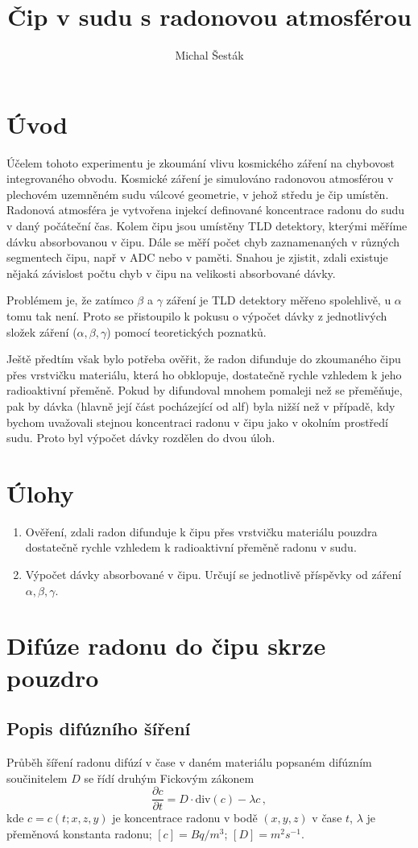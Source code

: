 \documentclass[11pt,a4paper]{article}
\author{Michal Šesták}
\title{Čip v sudu s radonovou atmosférou}
\begin{document}
\maketitle	
\tableofcontents
\section{Úvod}
Účelem tohoto experimentu je zkoumání vlivu kosmického záření na chybovost integrovaného obvodu. Kosmické záření je simulováno radonovou atmosférou v plechovém uzemněném sudu válcové geometrie, v jehož středu je čip umístěn. Radonová atmosféra je vytvořena injekcí definované koncentrace radonu do sudu v daný počáteční čas. Kolem čipu jsou umístěny TLD detektory, kterými měříme dávku absorbovanou v čipu. Dále se měří počet chyb zaznamenaných v různých segmentech čipu, např v ADC nebo v paměti. Snahou je zjistit, zdali existuje nějaká závislost počtu chyb v čipu na velikosti absorbované dávky.

Problémem je, že zatímco $\beta$ a $\gamma$ záření je TLD detektory měřeno spolehlivě, u $\alpha$ tomu tak není. Proto se přistoupilo k pokusu o výpočet dávky z jednotlivých složek záření ($\alpha, \beta, \gamma$) pomocí teoretických poznatků. 

Ještě předtím však bylo potřeba ověřit, že radon difunduje do zkoumaného čipu přes vrstvičku materiálu, která ho obklopuje, dostatečně rychle vzhledem k jeho radioaktivní přeměně. Pokud by difundoval mnohem pomaleji než se přeměňuje, pak by dávka (hlavně její část pocházející od alf) byla nižší než v případě, kdy bychom uvažovali stejnou koncentraci radonu v čipu jako v okolním prostředí sudu. Proto byl výpočet dávky rozdělen do dvou úloh.
\section{Úlohy}
\begin{enumerate}
	\item Ověření, zdali radon difunduje k čipu přes vrstvičku materiálu pouzdra dostatečně rychle vzhledem k radioaktivní přeměně radonu v sudu.
	\item Výpočet dávky absorbované v čipu. Určují se jednotlivě příspěvky od záření $\alpha, \beta, \gamma$.
\end{enumerate}
\clearpage
\section{Difúze radonu do čipu skrze pouzdro}
\subsection{Popis difúzního šíření}
Průběh šíření radonu difúzí v čase v daném materiálu popsaném difúzním součinitelem $D$ se řídí druhým Fickovým zákonem
\begin{equation}
\frac{\partial c}{\partial t}=D\cdot \text{div}(c)-\lambda c\,,\label{eq:fickuvLawObecne}
\end{equation}
kde $c=c(t;x,z,y)$ je koncentrace radonu v bodě $(x,y,z)$ v čase $t$, $\lambda$ je přeměnová konstanta radonu; $[c]=\si{Bq/m^3}$; $[D]=\si{m^2s^{-1}}$. 
\end{document}
